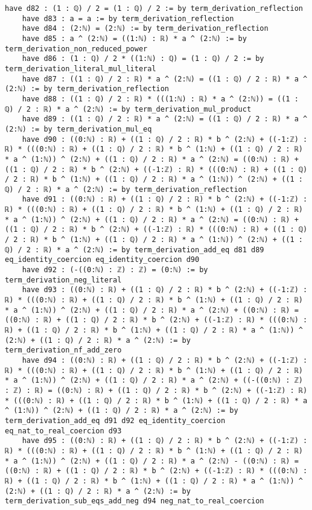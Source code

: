 \documentclass{article}
\begin{document}
\begin{tcolorbox}[colback=white!10, width=\linewidth]
\begin{lstlisting}[language=Lean4]
    have d82 : (1 : ℚ) / 2 = (1 : ℚ) / 2 := by term_derivation_reflection
    have d83 : a = a := by term_derivation_reflection
    have d84 : (2:ℕ) = (2:ℕ) := by term_derivation_reflection
    have d85 : a ^ (2:ℕ) = ((1:ℕ) : ℝ) * a ^ (2:ℕ) := by term_derivation_non_reduced_power
    have d86 : (1 : ℚ) / 2 * ((1:ℕ) : ℚ) = (1 : ℚ) / 2 := by term_derivation_literal_mul_literal
    have d87 : ((1 : ℚ) / 2 : ℝ) * a ^ (2:ℕ) = ((1 : ℚ) / 2 : ℝ) * a ^ (2:ℕ) := by term_derivation_reflection
    have d88 : ((1 : ℚ) / 2 : ℝ) * (((1:ℕ) : ℝ) * a ^ (2:ℕ)) = ((1 : ℚ) / 2 : ℝ) * a ^ (2:ℕ) := by term_derivation_mul_product
    have d89 : ((1 : ℚ) / 2 : ℝ) * a ^ (2:ℕ) = ((1 : ℚ) / 2 : ℝ) * a ^ (2:ℕ) := by term_derivation_mul_eq
    have d90 : ((0:ℕ) : ℝ) + ((1 : ℚ) / 2 : ℝ) * b ^ (2:ℕ) + ((-1:ℤ) : ℝ) * (((0:ℕ) : ℝ) + ((1 : ℚ) / 2 : ℝ) * b ^ (1:ℕ) + ((1 : ℚ) / 2 : ℝ) * a ^ (1:ℕ)) ^ (2:ℕ) + ((1 : ℚ) / 2 : ℝ) * a ^ (2:ℕ) = ((0:ℕ) : ℝ) + ((1 : ℚ) / 2 : ℝ) * b ^ (2:ℕ) + ((-1:ℤ) : ℝ) * (((0:ℕ) : ℝ) + ((1 : ℚ) / 2 : ℝ) * b ^ (1:ℕ) + ((1 : ℚ) / 2 : ℝ) * a ^ (1:ℕ)) ^ (2:ℕ) + ((1 : ℚ) / 2 : ℝ) * a ^ (2:ℕ) := by term_derivation_reflection
    have d91 : ((0:ℕ) : ℝ) + ((1 : ℚ) / 2 : ℝ) * b ^ (2:ℕ) + ((-1:ℤ) : ℝ) * (((0:ℕ) : ℝ) + ((1 : ℚ) / 2 : ℝ) * b ^ (1:ℕ) + ((1 : ℚ) / 2 : ℝ) * a ^ (1:ℕ)) ^ (2:ℕ) + ((1 : ℚ) / 2 : ℝ) * a ^ (2:ℕ) = ((0:ℕ) : ℝ) + ((1 : ℚ) / 2 : ℝ) * b ^ (2:ℕ) + ((-1:ℤ) : ℝ) * (((0:ℕ) : ℝ) + ((1 : ℚ) / 2 : ℝ) * b ^ (1:ℕ) + ((1 : ℚ) / 2 : ℝ) * a ^ (1:ℕ)) ^ (2:ℕ) + ((1 : ℚ) / 2 : ℝ) * a ^ (2:ℕ) := by term_derivation_add_eq d81 d89 eq_identity_coercion eq_identity_coercion d90
    have d92 : (-((0:ℕ) : ℤ) : ℤ) = (0:ℕ) := by term_derivation_neg_literal
    have d93 : ((0:ℕ) : ℝ) + ((1 : ℚ) / 2 : ℝ) * b ^ (2:ℕ) + ((-1:ℤ) : ℝ) * (((0:ℕ) : ℝ) + ((1 : ℚ) / 2 : ℝ) * b ^ (1:ℕ) + ((1 : ℚ) / 2 : ℝ) * a ^ (1:ℕ)) ^ (2:ℕ) + ((1 : ℚ) / 2 : ℝ) * a ^ (2:ℕ) + ((0:ℕ) : ℝ) = ((0:ℕ) : ℝ) + ((1 : ℚ) / 2 : ℝ) * b ^ (2:ℕ) + ((-1:ℤ) : ℝ) * (((0:ℕ) : ℝ) + ((1 : ℚ) / 2 : ℝ) * b ^ (1:ℕ) + ((1 : ℚ) / 2 : ℝ) * a ^ (1:ℕ)) ^ (2:ℕ) + ((1 : ℚ) / 2 : ℝ) * a ^ (2:ℕ) := by term_derivation_nf_add_zero
    have d94 : ((0:ℕ) : ℝ) + ((1 : ℚ) / 2 : ℝ) * b ^ (2:ℕ) + ((-1:ℤ) : ℝ) * (((0:ℕ) : ℝ) + ((1 : ℚ) / 2 : ℝ) * b ^ (1:ℕ) + ((1 : ℚ) / 2 : ℝ) * a ^ (1:ℕ)) ^ (2:ℕ) + ((1 : ℚ) / 2 : ℝ) * a ^ (2:ℕ) + ((-((0:ℕ) : ℤ) : ℤ) : ℝ) = ((0:ℕ) : ℝ) + ((1 : ℚ) / 2 : ℝ) * b ^ (2:ℕ) + ((-1:ℤ) : ℝ) * (((0:ℕ) : ℝ) + ((1 : ℚ) / 2 : ℝ) * b ^ (1:ℕ) + ((1 : ℚ) / 2 : ℝ) * a ^ (1:ℕ)) ^ (2:ℕ) + ((1 : ℚ) / 2 : ℝ) * a ^ (2:ℕ) := by term_derivation_add_eq d91 d92 eq_identity_coercion eq_nat_to_real_coercion d93
    have d95 : ((0:ℕ) : ℝ) + ((1 : ℚ) / 2 : ℝ) * b ^ (2:ℕ) + ((-1:ℤ) : ℝ) * (((0:ℕ) : ℝ) + ((1 : ℚ) / 2 : ℝ) * b ^ (1:ℕ) + ((1 : ℚ) / 2 : ℝ) * a ^ (1:ℕ)) ^ (2:ℕ) + ((1 : ℚ) / 2 : ℝ) * a ^ (2:ℕ) - ((0:ℕ) : ℝ) = ((0:ℕ) : ℝ) + ((1 : ℚ) / 2 : ℝ) * b ^ (2:ℕ) + ((-1:ℤ) : ℝ) * (((0:ℕ) : ℝ) + ((1 : ℚ) / 2 : ℝ) * b ^ (1:ℕ) + ((1 : ℚ) / 2 : ℝ) * a ^ (1:ℕ)) ^ (2:ℕ) + ((1 : ℚ) / 2 : ℝ) * a ^ (2:ℕ) := by term_derivation_sub_eqs_add_neg d94 neg_nat_to_real_coercion

\end{lstlisting}
\end{tcolorbox}
\end{document}
